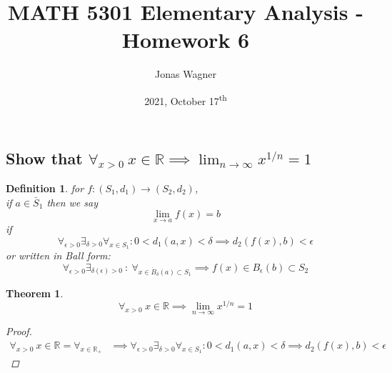 \documentclass[]{article}
\title{MATH 5301 Elementary Analysis - Homework 6}
\author{Jonas Wagner}
\date{2021, October 17\textsuperscript{th}}
\newcommand{\R}{\mathbb{R}}
\newcommand{\st}{\ : \ }
\newtheorem{definition}{Definition}
\newtheorem{theorem}{Theorem}
\begin{document}
\maketitle

\section{}
\subsection{Show that $\forall_{x > 0} \ x\in \R \implies \lim_{n\to \infty} x^{1/n} = 1$}

\begin{definition}
    for $f : (S_1, d_1) \to (S_2,d_2)$, \\
    if $a \in \bar{S}_1$ then we say 
    $$\lim_{x\to a} f(x) = b$$ if 
    $$\forall_{\epsilon>0} \exists_{\delta>0} \forall_{x \in S_1} : 0 < d_1(a,x) < \delta \implies d_2(f(x),b) < \epsilon$$
    or written in Ball form:
    $$\forall_{\epsilon>0} \exists_{\delta(\epsilon) > 0} \st \forall_{x \in \dot{B}_\delta(a) \subset S_1} \implies f(x) \in B_{\epsilon}(b) \subset S_2$$
\end{definition}

\begin{theorem}
    $$\forall_{x > 0} \ x\in \R \implies \lim_{n\to \infty} x^{1/n} = 1$$
    \begin{proof}
        \begin{align*}
            \forall_{x > 0} \ x\in \R = \forall_{x \in \R_+}
            &\implies \forall_{\epsilon>0} \exists_{\delta>0} \forall_{x \in S_1} : 0 < d_1(a,x) < \delta \implies d_2(f(x),b) < \epsilon
        \end{align*}
    \end{proof}
\end{theorem}
\end{document}
